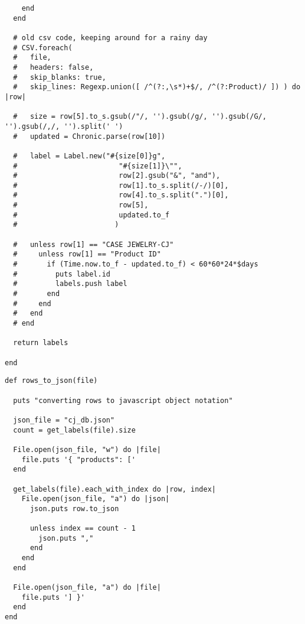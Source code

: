 \documentclass[11pt]{article}
\begin{document}
\begin{verbatim}
    end
  end

  # old csv code, keeping around for a rainy day
  # CSV.foreach(
  #   file,
  #   headers: false,
  #   skip_blanks: true,
  #   skip_lines: Regexp.union([ /^(?:,\s*)+$/, /^(?:Product)/ ]) ) do |row|

  #   size = row[5].to_s.gsub(/"/, '').gsub(/g/, '').gsub(/G/, '').gsub(/,/, '').split(' ')
  #   updated = Chronic.parse(row[10])

  #   label = Label.new("#{size[0]}g",
  #                        "#{size[1]}\"",
  #                        row[2].gsub("&", "and"),
  #                        row[1].to_s.split(/-/)[0],
  #                        row[4].to_s.split(".")[0],
  #                        row[5],
  #                        updated.to_f
  #                       )

  #   unless row[1] == "CASE JEWELRY-CJ"
  #     unless row[1] == "Product ID"
  #       if (Time.now.to_f - updated.to_f) < 60*60*24*$days
  #         puts label.id
  #         labels.push label
  #       end
  #     end
  #   end
  # end

  return labels

end
\end{verbatim}

\begin{verbatim}
def rows_to_json(file)

  puts "converting rows to javascript object notation"

  json_file = "cj_db.json"
  count = get_labels(file).size

  File.open(json_file, "w") do |file|
    file.puts '{ "products": ['
  end

  get_labels(file).each_with_index do |row, index|
    File.open(json_file, "a") do |json|
      json.puts row.to_json

      unless index == count - 1
        json.puts ","
      end
    end
  end

  File.open(json_file, "a") do |file|
    file.puts '] }'
  end
end
\end{verbatim}
\end{document}
